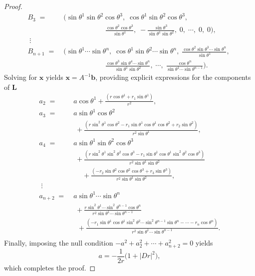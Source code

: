 \documentclass[reqno,11pt, letterpaper]{amsart}
\theoremstyle{plain}
\theoremstyle{definition}
\numberwithin{equation}{section}
\begin{document}
\begin{proof}
\begin{align*}
     		B_3\;=\;&\Big(\sin\theta^1\sin\theta^2\cos\theta^3,\;\cos\theta^1\sin\theta^2\cos\theta^3,\;   \\
     		&\qquad\qquad\qquad \frac{\cos\theta^2\cos\theta^3}{\sin\theta^1},\; -\frac{\sin\theta^3}{\sin\theta^1\sin\theta^2},\;0,\;\cdots,\; 0,\;0 \Big),\;\\
     		\;\vdots&\\
     		B_{n+1}\;=\;&\Big(\sin\theta^1\cdots\sin\theta^n,\;\cos\theta^1\sin\theta^2\cdots\sin\theta^n,\;  \frac{\cos\theta^2\sin\theta^3\cdots\sin\theta^n}{\sin\theta^1},\; \\
     		&\qquad\qquad\qquad  \frac{\cos\theta^3\sin\theta^4\cdots\sin\theta^n}{\sin\theta^1\sin\theta^2},\;\cdots,\; \frac{\cos\theta^n}{\sin\theta^1\cdots\sin\theta^{n-1}} \Big).
     	\end{align*}
     	Solving for $\mathbf{x}$ yields $\mathbf{x} = A^{-1}\mathbf{b}$, providing explicit expressions for the components of $\mathbf{L}$
     	 \begin{align*}
     		a_2\;=\;&a\cos\theta^1+\frac{\left(r\cos\theta^1+r_1\sin\theta^1\right)}{r^2},\\
     		a_3\;=\;&a\sin\theta^1\cos\theta^2\\
     		&\;+\frac{\left(r\sin^2\theta^1\cos\theta^2-r_1\sin\theta^1\cos\theta^1\cos\theta^2+r_2\sin\theta^2\right)}{r^2\sin\theta^1},\\
     		a_4\;=\;&a\sin\theta^1\sin\theta^2\cos\theta^3\\
     		&\;+\frac{\left(r\sin^2\theta^1\sin^2\theta^2\cos\theta^3-r_1\sin\theta^1\cos\theta^1\sin^2\theta^2\cos\theta^3\right)}{r^2\sin\theta^1\sin\theta^2}\\
     		&\;\quad+\frac{\left(-r_2\sin\theta^2\cos\theta^2\cos\theta^3+r_3\sin\theta^3\right)}{r^2\sin\theta^1\sin\theta^2},\\
     		\;\vdots&\\
     		a_{n+2}\;=\;&a\sin\theta^1\cdots\sin\theta^n\\
     		&\;+\frac{r\sin^2\theta^1\cdots\sin^2\theta^{n-1}\cos\theta^n}{r^2\sin\theta^1\cdots\sin\theta^{n-1}}\\
     		&\;\;+\frac{\left(-r_1\sin\theta^1\cos\theta^1\sin^2\theta^2\cdots\sin^2\theta^{n-1}\sin\theta^n-\cdots-r_n\cos\theta^n\right)}{r^2\sin\theta^1\cdots\sin\theta^{n-1}}.\\
     	\end{align*}       	
     	Finally, imposing the null condition $-a^2 + a_2^2 + \cdots + a_{n+2}^2 = 0$ yields
     	\[
     	a = -\frac{1}{2r}\Big(1 + |Dr|^2\Big),
     	\]  
     	which completes the proof.
     \end{proof}
\end{document}

